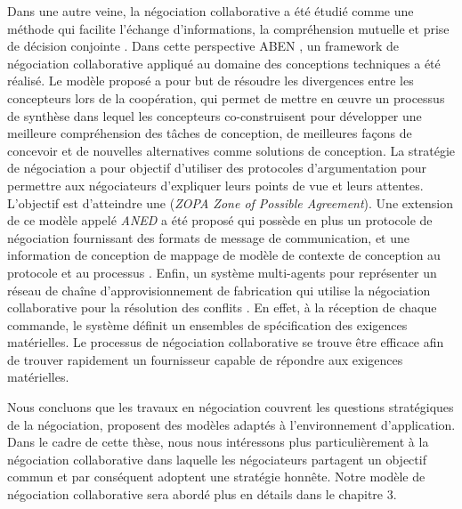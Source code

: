 		Dans une autre veine, la négociation collaborative a été étudié comme une méthode qui facilite l'échange d'informations, la compréhension mutuelle et prise de décision conjointe \cite{jin2010study}. 
		Dans cette perspective ABEN \cite{jin2009argumentation}, un framework de négociation collaborative appliqué au domaine des conceptions techniques a été réalisé. Le modèle proposé a pour but de résoudre les divergences entre les concepteurs lors de la coopération, qui permet de mettre en œuvre un processus de synthèse dans lequel les concepteurs co-construisent pour développer une meilleure compréhension des tâches de conception, de meilleures façons de concevoir et de nouvelles alternatives comme solutions de conception. La stratégie de négociation a pour objectif d'utiliser des protocoles d'argumentation pour permettre aux négociateurs d'expliquer leurs points de vue et leurs attentes. L'objectif est d'atteindre une (\emph{ZOPA  Zone of Possible Agreement}). Une extension de ce modèle appelé \emph{ANED} a été proposé qui possède en plus un protocole de négociation fournissant des formats de message de communication, et une information de conception de mappage de modèle de contexte de conception au protocole et au processus \cite{jin2010study}. 	
		Enfin, un système multi-agents pour représenter un réseau de chaîne d'approvisionnement de fabrication qui utilise la négociation collaborative pour la résolution des conflits \cite{jiao2006agent}. En effet, à la réception de chaque commande, le système définit un ensembles de spécification des exigences matérielles. Le processus de négociation collaborative se trouve être efficace afin de trouver rapidement un fournisseur capable de répondre aux exigences matérielles.
		
		  
		Nous concluons que les travaux en négociation couvrent les questions stratégiques de la négociation, proposent des modèles adaptés à l'environnement d'application. Dans le cadre de cette thèse, nous nous intéressons plus particulièrement à la négociation collaborative dans laquelle les négociateurs partagent un objectif commun et par conséquent adoptent une stratégie honnête. Notre modèle de négociation collaborative sera abordé plus en détails dans le chapitre 3. 
		
		

